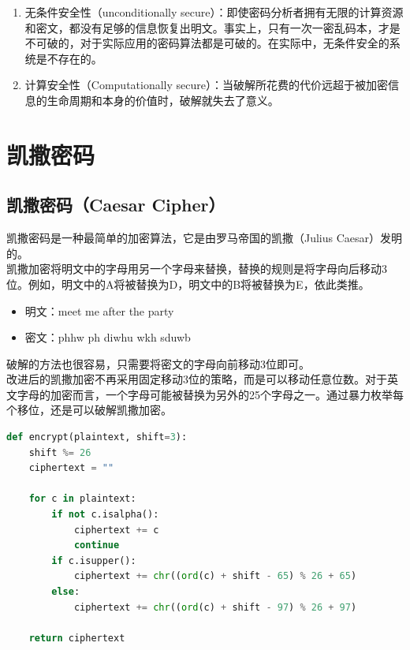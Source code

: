 \begin{enumerate}
    \item 无条件安全性（unconditionally secure）：即使密码分析者拥有无限的计算资源和密文，都没有足够的信息恢复出明文。事实上，只有一次一密乱码本，才是不可破的，对于实际应用的密码算法都是可破的。在实际中，无条件安全的系统是不存在的。
    \item 计算安全性（Computationally secure）：当破解所花费的代价远超于被加密信息的生命周期和本身的价值时，破解就失去了意义。
\end{enumerate}

\newpage

\section{凯撒密码}

\subsection{凯撒密码（Caesar Cipher）}

凯撒密码是一种最简单的加密算法，它是由罗马帝国的凯撒（Julius Caesar）发明的。\\

凯撒加密将明文中的字母用另一个字母来替换，替换的规则是将字母向后移动3位。例如，明文中的A将被替换为D，明文中的B将被替换为E，依此类推。

\begin{itemize}
    \item 明文：meet me after the party
    \item 密文：phhw ph diwhu wkh sduwb
\end{itemize}

破解的方法也很容易，只需要将密文的字母向前移动3位即可。\\

改进后的凯撒加密不再采用固定移动3位的策略，而是可以移动任意位数。对于英文字母的加密而言，一个字母可能被替换为另外的25个字母之一。通过暴力枚举每个移位，还是可以破解凯撒加密。\\


\begin{lstlisting}[language=Python]
def encrypt(plaintext, shift=3):
    shift %= 26
    ciphertext = ""

    for c in plaintext:
        if not c.isalpha():
            ciphertext += c
            continue
        if c.isupper():
            ciphertext += chr((ord(c) + shift - 65) % 26 + 65)
        else:
            ciphertext += chr((ord(c) + shift - 97) % 26 + 97)

    return ciphertext
\end{lstlisting}

